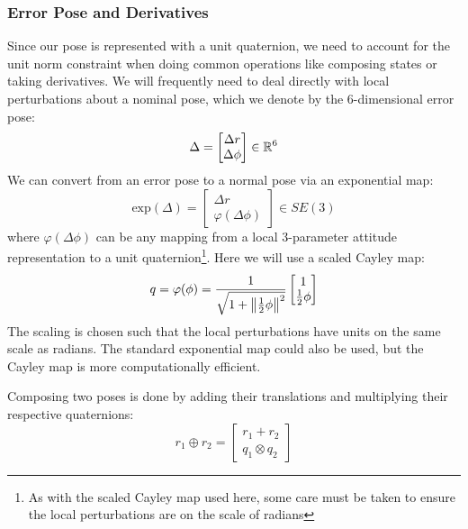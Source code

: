 \documentclass[../root.tex]{subfiles}
\begin{document}
\subsubsection{Error Pose and Derivatives}
Since our pose is represented with a unit quaternion, we need to account for the unit 
norm constraint when doing common operations like composing states or taking derivatives.
We will frequently need to deal directly with local perturbations about a nominal pose, 
which we denote by the 6-dimensional error pose:
\begin{equation}
    \Delta = \begin{bmatrix}
        \Delta r \\ \Delta \phi
    \end{bmatrix} \in \mathbb{R}^6
\end{equation}
We can convert from an error pose to a normal pose via an exponential map:
\begin{equation}
    \text{exp}(\Delta) = \begin{bmatrix}
        \Delta r \\ \varphi(\Delta \phi)
    \end{bmatrix} \in SE(3)
\end{equation}
where $\varphi(\Delta \phi)$ can be any mapping from a local 3-parameter attitude 
representation to a unit quaternion\footnote{As with the scaled Cayley map used here, 
some care must be taken to ensure the local perturbations are on the scale of radians}. 
Here we will use a scaled Cayley map:
\begin{equation}
    q = \varphi(\phi) = \frac{1}{\sqrt{1 + \norm{\frac{1}{2} \phi}^2}} \begin{bmatrix}
        1 \\ \frac{1}{2} \phi
    \end{bmatrix}
\end{equation}
The scaling is chosen such that the local perturbations have units on the same scale as 
radians. The standard exponential map could also be used, but the Cayley map is more 
computationally efficient. 

Composing two poses is done by adding their translations and multiplying their respective 
quaternions:
\begin{equation}
    r_1 \oplus r_2 = \begin{bmatrix}
        r_1 + r_2 \\ q_1 \otimes q_2
    \end{bmatrix}
\end{equation}
\end{document}
